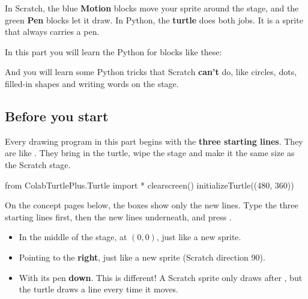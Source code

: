 
In Scratch, the blue \textbf{Motion} blocks move your sprite around the stage, and the green \textbf{Pen} blocks let it draw. In Python, the \textbf{turtle} does both jobs. It is a sprite that always carries a pen.

In this part you will learn the Python for blocks like these:

{\raggedright {}            \par}

And you will learn some Python tricks that Scratch \textbf{can't} do, like circles, dots, filled-in shapes and writing words on the stage.

\subsection*{Before you start}

Every drawing program in this part begins with the \textbf{three starting lines}. They are like . They bring in the turtle, wipe the stage and make it the same size as the Scratch stage.

\begin{typethis}
from ColabTurtlePlus.Turtle import *
clearscreen()
initializeTurtle((480, 360))
\end{typethis}

On the concept pages below, the boxes show only the new lines. Type the three starting lines first, then the new lines underneath, and press \playbtn.

\begin{think}
\begin{itemize}
  \item In the middle of the stage, at $(0, 0)$, just like a new sprite.
  \item Pointing to the \textbf{right}, just like a new sprite (Scratch direction 90).
  \item With its pen \textbf{down}. This is different! A Scratch sprite only draws after , but the turtle draws a line every time it moves.
\end{itemize}
\end{think}

